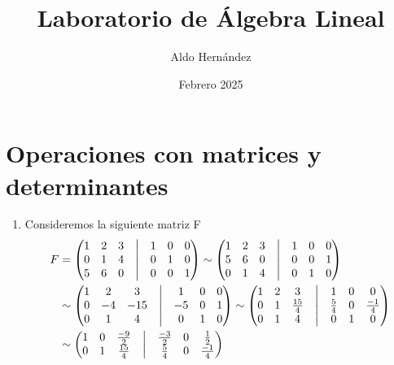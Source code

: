 \documentclass[12pt, letterpaper]{article}
\title{Laboratorio de Álgebra Lineal}
\author{Aldo Hernández}
\date{Febrero 2025}
\begin{document}
\maketitle

\section{Operaciones con matrices y determinantes}
\begin{enumerate}
    \item Consideremos la siguiente matriz F
    \begin{equation*}
        \begin{aligned}
            F
            & =
            \begin{pmatrix}
                1 & 2 & 3 &\bigm| & 1 & 0 & 0 \\
                0 & 1 & 4 &\bigm| & 0 & 1 & 0 \\
                5 & 6 & 0 &\bigm| & 0 & 0 & 1 
            \end{pmatrix}
            \sim
            \begin{pmatrix}
                1 & 2 & 3 &\bigm| & 1 & 0 & 0 \\
                5 & 6 & 0 &\bigm| & 0 & 0 & 1 \\
                0 & 1 & 4 &\bigm| & 0 & 1 & 0 
            \end{pmatrix} \\
            & \sim
            \begin{pmatrix}
                1 & 2 & 3 &\bigm| & 1 & 0 & 0 \\
                0 & -4 & -15 &\bigm| & -5 & 0 & 1 \\
                0 & 1 & 4 &\bigm| & 0 & 1 & 0 
            \end{pmatrix} 
            \sim
            \begin{pmatrix}
                1 & 2 & 3 &\bigm| & 1 & 0 & 0 \\
                0 & 1 & \frac{15}{4} &\bigm| & \frac{5}{4} & 0 & \frac{-1}{4} \\
                0 & 1 & 4 &\bigm| & 0 & 1 & 0 
            \end{pmatrix} \\
            & \sim
            \begin{pmatrix}
                1 & 0 & \frac{-9}{2} &\bigm| & \frac{-3}{2} & 0 & \frac{1}{2} \\
                0 & 1 & \frac{15}{4} &\bigm| & \frac{5}{4} & 0 & \frac{-1}{4} \\

\end{pmatrix}
\end{aligned}
\end{equation*}
\end{enumerate}
\end{document}

